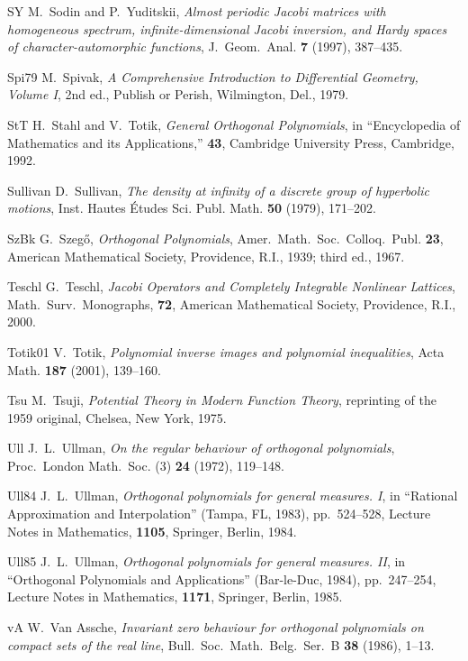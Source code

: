 \documentclass[reqno,centertags, 12pt]{amsart}
\numberwithin{equation}{section}
\theoremstyle{definition}
\begin{document}
\begin{thebibliography}{999}
{\bibitem}{SY} M.~Sodin and P.~Yuditskii, {\it Almost periodic Jacobi
matrices with homogeneous spectrum, infinite-dimensional Jacobi
inversion, and Hardy spaces of character-automorphic functions}, J.\
Geom.\ Anal. {\bf 7} (1997), 387--435.

{\bibitem}{Spi79} M.~Spivak, \textit{A Comprehensive Introduction to
Differential Geometry, Volume I}, 2nd ed., Publish or Perish,
Wilmington, Del., 1979.

{\bibitem}{StT} H.~Stahl and V.~Totik, \textit{General Orthogonal
Polynomials}, in ``Encyclopedia of Mathematics and its
Applications,'' {\bf 43}, Cambridge University Press, Cambridge,
1992.

{\bibitem}{Sullivan} D.~Sullivan, {\it The density at infinity of a
discrete group of hyperbolic motions}, Inst. Hautes \'Etudes Sci.
Publ. Math. {\bf 50} (1979), 171--202.

{\bibitem}{SzBk} G.~Szeg\H{o}, \textit{Orthogonal Polynomials}, Amer.\
Math.\ Soc.\ Colloq.\ Publ. \textbf{23}, American Mathematical
Society, Providence, R.I., 1939; third ed., 1967.

{\bibitem}{Teschl} G.~Teschl, \textit{Jacobi Operators and Completely
Integrable Nonlinear Lattices}, Math.\ Surv.\ Monographs, {\bf 72},
American Mathematical Society, Providence, R.I., 2000.

{\bibitem}{Totik01} V.~Totik, {\it Polynomial inverse images and polynomial
inequalities}, Acta Math. {\bf 187} (2001),  139--160.

{\bibitem}{Tsu} M.~Tsuji, \textit{Potential Theory in Modern Function
Theory}, reprinting of the 1959 original, Chelsea, New York, 1975.

{\bibitem}{Ull} J.~L.~Ullman, {\it On the regular behaviour of orthogonal
polynomials}, Proc.\ London Math.\ Soc. (3) {\bf 24} (1972),
119--148.

{\bibitem}{Ull84} J.~L.~Ullman, {\it Orthogonal polynomials for general
measures. I}, in ``Rational Approximation and Interpolation''
(Tampa, FL, 1983), pp.~524--528, Lecture Notes in Mathematics, {\bf 1105},
Springer, Berlin, 1984.

{\bibitem}{Ull85} J.~L.~Ullman, {\it Orthogonal polynomials for general
measures. II}, in ``Orthogonal Polynomials and Applications''
(Bar-le-Duc, 1984), pp.~247--254, Lecture Notes in Mathematics, {\bf
1171}, Springer, Berlin, 1985.

{\bibitem}{vA} W.~Van Assche, {\it Invariant zero behaviour for orthogonal
polynomials on compact sets of the real line}, Bull.\ Soc.\ Math.\
Belg.\ Ser.\ B {\bf 38} (1986), 1--13.


\end{thebibliography}
\end{document}

